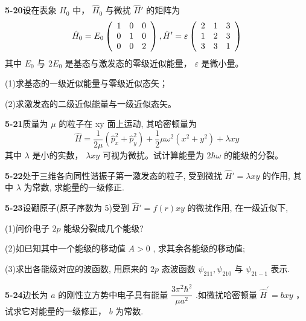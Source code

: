 \textbf{5-20}\quad 设在表象 $\displaystyle \hat{H}_0$ 中， $\displaystyle \hat{H}_0$ 与微扰 $\displaystyle \hat{H}'$ 的矩阵为
$$
\hat {H} _ {0} = E _ {0} \left( \begin{array}{c c c} 1 & 0 & 0 \\ 0 & 1 & 0 \\ 0 & 0 & 2 \end{array} \right), \hat {H} ^ {\prime} = \varepsilon \left( \begin{array}{c c c} 2 & 1 & 3 \\ 1 & 2 & 3 \\ 3 & 3 & 1 \end{array} \right)
$$
其中 $\displaystyle E_0$ 与 $\displaystyle 2E_0$ 是基态与激发态的零级近似能量， $\displaystyle \varepsilon$ 是微小量。

(1)求基态的一级近似能量与零级近似态矢；

(2)求激发态的二级近似能量与一级近似态矢。

\vfill

\newpage

\textbf{5-21}\quad 质量为 $\displaystyle \mu$ 的粒子在 xy 面上运动, 其哈密顿量为
$$
\hat {H} = \dfrac {1}{2 \mu} (\hat {p} _ {x} ^ {2} + \hat {p} _ {y} ^ {2}) + \dfrac {1}{2} \mu \omega^ {2} (x ^ {2} + y ^ {2}) + \lambda x y
$$
其中 $\displaystyle \lambda$ 是小的实数， $\displaystyle \lambda xy$ 可视为微扰。试计算能量为 $\displaystyle 2\hbar\omega$ 的能级的分裂。

\vfill

\newpage

\textbf{5-22}\quad 处于三维各向同性谐振子第一激发态的粒子, 受到微扰 $\displaystyle \hat{H}' = \lambda xy$ 的作用, 其中 $\displaystyle \lambda$ 为常数, 求能量的一级修正.

\vfill

\newpage

\textbf{5-23}\quad 设硼原子(原子序数为 5)受到 $\displaystyle \hat{H}' = f(r)xy$ 的微扰作用, 在一级近似下,

(1)问价电子 $\displaystyle 2p$ 能级分裂成几个能级?

(2)如已知其中一个能级的移动值 $\displaystyle A > 0$ , 求其余各能级的移动值;

(3)求出各能级对应的波函数, 用原来的 $\displaystyle 2p$ 态波函数 $\displaystyle \psi_{211}, \psi_{210}$ 与 $\displaystyle \psi_{21-1}$ 表示.

\vfill

\newpage

\textbf{5-24}\quad 边长为 $\displaystyle a$ 的刚性立方势中电子具有能量 $\displaystyle \dfrac{3\pi^2\hbar^2}{\mu a^2}$ .如微扰哈密顿量 $\displaystyle \hat{H}^{\prime} = bxy$ ，试求它对能量的一级修正， $\displaystyle b$ 为常数.

